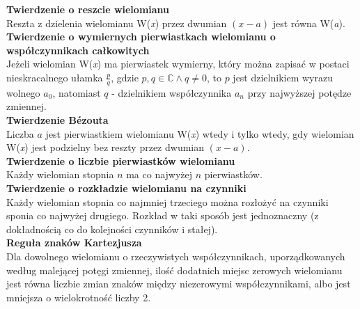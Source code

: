 \documentclass[14pt,a4paper]{extarticle}
\begin{document}
\smallskip
\noindent\textbf{Twierdzenie o reszcie wielomianu}\\
Reszta z dzielenia wielomianu W(\textit{x}) przez dwumian $(x - a)$ jest równa W(\textit{a}).\\

\smallskip
\newpage
\noindent\textbf{Twierdzenie o wymiernych pierwiastkach wielomianu o współczynnikach całkowitych}\\
Jeżeli wielomian W(\textit{x}) ma pierwiastek wymierny, który można zapisać w postaci nieskracalnego ułamka $\frac{p}{q}$, gdzie $p, q \in \mathbb{C} \land q \neq 0$, to 
$p$ jest dzielnikiem wyrazu wolnego $a_{0}$, natomiast $q$ - dzielnikiem współczynnika $a_{n}$ przy najwyższej potędze zmiennej.\\

\smallskip
\noindent\textbf{Twierdzenie B\'ezouta}\\
Liczba $a$ jest pierwiastkiem wielomianu W(\textit{x}) wtedy i tylko wtedy, gdy wielomian W(\textit{x}) jest podzielny bez reszty przez dwumian $(x - a)$.\\

\smallskip
\noindent\textbf{Twierdzenie o liczbie pierwiastków wielomianu}\\
Każdy wielomian stopnia $n$ ma co najwyżej $n$ pierwiastków.\\

\smallskip
\noindent\textbf{Twierdzenie o rozkładzie wielomianu na czynniki}\\
Każdy wielomian stopnia co najmniej trzeciego można rozłożyć na czynniki sponia co najwyżej drugiego.
Rozkład w taki sposób jest jednoznaczny (z dokładnością co do kolejności czynników i stałej).\\

\smallskip
\noindent\textbf{Reguła znaków Kartezjusza}\\
Dla dowolnego wielomianu o rzeczywistych współczynnikach, uporządkowanych według malejącej potęgi zmiennej,
ilość dodatnich miejsc zerowych wielomianu jest równa liczbie zmian znaków między niezerowymi współczynnikami, 
albo jest mniejsza o wielokrotność liczby 2.\\

\smallskip

\renewcommand{\arraycolsep}{0.35cm}
\renewcommand{\arraystretch}{1.25}
\end{document}
